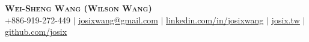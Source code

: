 \documentclass[letterpaper,11pt]{article}
\begin{document}

\begin{center}
    \textbf{\Huge \scshape Wei-Sheng Wang (Wilson Wang)} \\ \vspace{1pt}
    \small +886-919-272-449 $|$ \href{mailto:josixwang@gmail.com}{\underline{josixwang@gmail.com}} $|$ 
    \href{https://www.linkedin.com/in/josixwang/}{\underline{linkedin.com/in/josixwang}} $|$
    \href{https://josix.tw}{\underline{josix.tw}} $|$
    \href{https://github.com/josix}{\underline{github.com/josix}}
\end{center}

\end{document}
